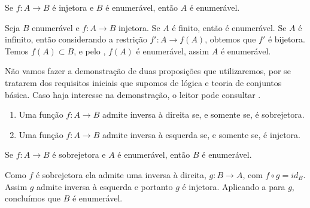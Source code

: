 \documentclass[../main.tex]{subfiles}
\begin{document}
    

\begin{prop}\label{enum-prop-ABFinjetoraBenumeravelAenumeravel}
    Se $f \colon A \to B$ é injetora e $B$ é enumerável, então $A$ é enumerável.
\end{prop}
\begin{dem}
    Seja $B$ enumerável e $f \colon A \to B$ injetora.
    Se $A$ é finito, então é enumerável. Se $A$ é infinito, então considerando a restrição $f' \colon A \to f(A)$, obtemos que $f'$ é bijetora.
    Temos $f(A) \subset B$, e pelo , $f(A)$ é enumerável, assim $A$ é enumerável.
\end{dem}

\begin{obs}
    Não vamos fazer a demonstração de duas proposições que utilizaremos, por se tratarem dos requisitos iniciais que supomos de lógica e teoria de conjuntos básica. Caso haja interesse na demonstração, o leitor pode consultar \textcite[p. 22]{lima-analise-1}.
    \begin{enumerate}[label=(\roman*)]
        \item Uma função $f \colon A \to B$ admite inversa à direita se, e somente se, é sobrejetora.
        \item Uma função $f \colon A \to B$ admite inversa à esquerda se, e somente se, é injetora.
    \end{enumerate}
\end{obs}

\begin{prop}\label{enum-prop-ABFsobrejetoraAenumeravelBenumeravel}
    Se $f \colon A \to B$ é sobrejetora e $A$ é enumerável, então $B$ é enumerável.
\end{prop}
\begin{dem}
    Como $f$ é sobrejetora ela admite uma inversa à direita, $g \colon B \to A$, com $f \circ g = id_B$. Assim $g$ admite inversa à esquerda e portanto $g$ é injetora. Aplicando a  para $g$, concluímos que $B$ é enumerável. 
\end{dem}

\end{document}
